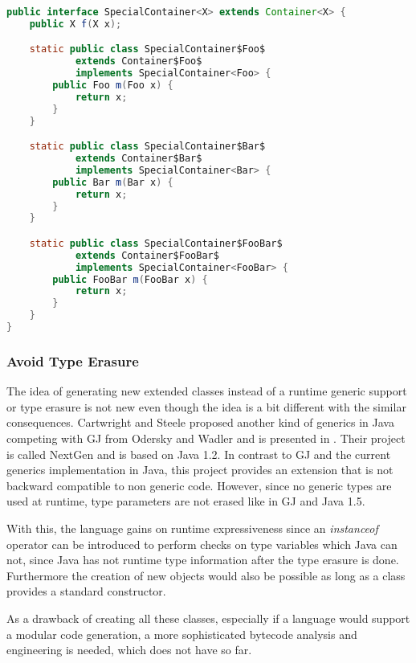 \begin{lstlisting}[language=java,caption=Extending a container class translated to Java.,label=lst:extendingContainer]
public interface SpecialContainer<X> extends Container<X> {
	public X f(X x);

	static public class SpecialContainer$Foo$
			extends Container$Foo$
			implements SpecialContainer<Foo> {
		public Foo m(Foo x) {
			return x;
		}
	}

	static public class SpecialContainer$Bar$
			extends Container$Bar$
			implements SpecialContainer<Bar> {
		public Bar m(Bar x) {
			return x;
		}
	}

	static public class SpecialContainer$FooBar$
			extends Container$FooBar$
			implements SpecialContainer<FooBar> {
		public FooBar m(FooBar x) {
			return x;
		}
	}
}
\end{lstlisting}

\subsubsection{Avoid Type Erasure}
The idea of generating new extended classes instead of a runtime generic
support or type erasure is not new even though the idea is a bit different
with the similar consequences.  Cartwright and Steele proposed
another kind of generics in Java competing with GJ from Odersky and
Wadler and is presented in \cite{cartwright_compatible_1998}. Their
project is called NextGen and is based on Java 1.2. In contrast to GJ
and the current generics implementation in Java, this project provides an
extension that is not backward compatible to non generic code. However,
since no generic types are used at runtime, type parameters are not
erased like in GJ and Java 1.5.

With this, the language gains on runtime expressiveness since an
\emph{instanceof} operator can be introduced to perform checks on type
variables which Java can not, since Java has not runtime type information
after the type erasure is done. Furthermore the creation of new objects
would also be possible as long as a class provides a standard constructor.

As a drawback of creating all these classes, especially  if a language
would support a modular code generation, a more sophisticated bytecode
analysis and engineering is needed, which \ooplss does not have so far.

